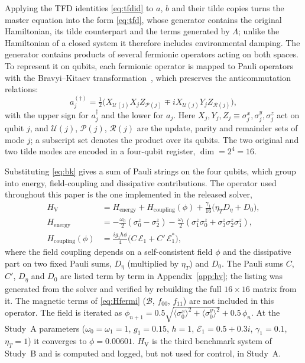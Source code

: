 \documentclass[conference]{IEEEtran}
\newcommand{\cE}{\mathcal{E}}
\newcommand{\HV}{H_{\mathrm{V}}}
\begin{document}
Applying the TFD identities \eqref{eq:tfdid} to $a$, $b$ and their tilde copies turns the master equation into the form \eqref{eq:tfd}, whose generator contains the original Hamiltonian, its tilde counterpart and the terms generated by $\Lambda$; unlike the Hamiltonian of a closed system it therefore includes environmental damping. The generator contains products of several fermionic operators acting on both spaces. To represent it on qubits, each fermionic operator is mapped to Pauli operators with the Bravyi--Kitaev transformation~\cite{bravyi2002}, which preserves the anticommutation relations:
\begin{equation}
a_j^{(\dagger)}=\tfrac12\big(X_{\mathcal U(j)}X_jZ_{\mathcal P(j)}\mp iX_{\mathcal U(j)}Y_jZ_{\mathcal R(j)}\big),
\label{eq:bk}
\end{equation}
with the upper sign for $a_j^\dagger$ and the lower for $a_j$. Here $X_j,Y_j,Z_j\equiv\sigma^x_j,\sigma^y_j,\sigma^z_j$ act on qubit $j$, and $\mathcal U(j)$, $\mathcal P(j)$, $\mathcal R(j)$ are the update, parity and remainder sets of mode $j$; a subscript set denotes the product over its qubits. The two original and two tilde modes are encoded in a four-qubit register, $\dim=2^4=16$.

Substituting \eqref{eq:bk} gives a sum of Pauli strings on the four qubits, which group into energy, field-coupling and dissipative contributions. The operator used throughout this paper is the one implemented in the released solver,
\begin{align}
\HV&=H_{\mathrm{energy}}+H_{\mathrm{coupling}}(\phi)+\tfrac{\gamma_1}{16}\big(\eta_T D_\eta+D_0\big),\label{eq:HV}\\
H_{\mathrm{energy}}&=-\tfrac{\omega_0}{2}(\sigma^z_0-\sigma^z_2)-\tfrac{\omega_1}{2}(\sigma^z_1\sigma^z_0+\sigma^z_3\sigma^z_2\sigma^z_1),\nonumber\\
H_{\mathrm{coupling}}(\phi)&=\tfrac{i g_1 h\phi}{4}\big(C\,\cE_1+C'\,\cE_1^{*}\big),\nonumber
\end{align}
where the field coupling depends on a self-consistent field $\phi$ and the dissipative part on two fixed Pauli sums, $D_\eta$ (multiplied by $\eta_T$) and $D_0$. The Pauli sums $C$, $C'$, $D_\eta$ and $D_0$ are listed term by term in Appendix~\ref{app:hv}; the listing was generated from the solver and verified by rebuilding the full $16{\times}16$ matrix from it. The magnetic terms of \eqref{eq:Hfermi} ($\mathcal B$, $f_{00}$, $f_{11}$) are not included in this operator. The field is iterated as $\phi_{n+1}=0.5\sqrt{\langle\sigma^x_0\rangle^2+\langle\sigma^y_0\rangle^2}+0.5\,\phi_n$. At the Study~A parameters ($\omega_0=\omega_1=1$, $g_1=0.15$, $h=1$, $\cE_1=0.5+0.3i$, $\gamma_1=0.1$, $\eta_T=1$) it converges to $\phi=0.00601$. $\HV$ is the third benchmark system of Study~B and is computed and logged, but not used for control, in Study~A.
\end{document}
